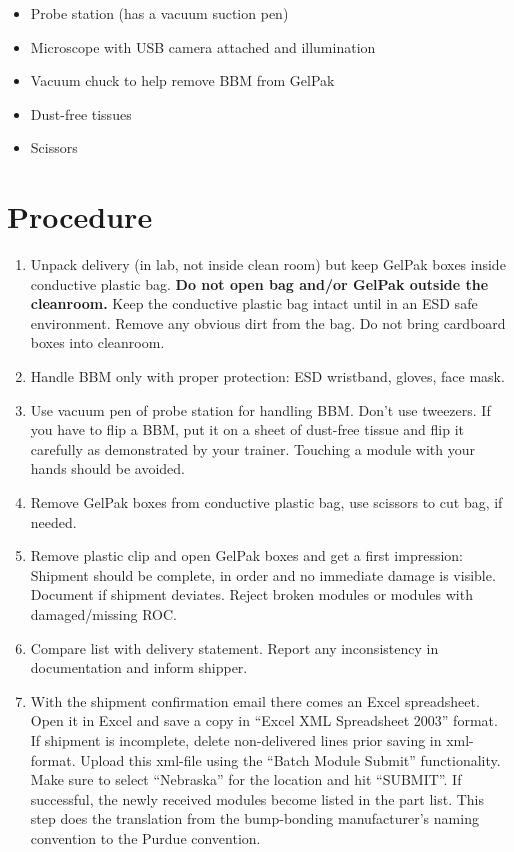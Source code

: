 \documentclass[12pt]{unlsilabsop}
\begin{document}
\begin{itemize}
    \item Probe station (has a vacuum suction pen)
    \item Microscope with USB camera attached and illumination
    \item Vacuum chuck to help remove BBM from GelPak
    \item Dust-free tissues
    \item Scissors
\end{itemize}

\section{Procedure}

\begin{enumerate}
    \item Unpack delivery (in lab, not inside clean room) but keep GelPak boxes inside conductive plastic bag. \textbf{Do not open bag and/or GelPak outside the cleanroom.} Keep the conductive plastic bag intact until in an ESD safe environment. Remove any obvious dirt from the bag. Do not bring cardboard boxes into cleanroom.
    \item Handle BBM only with proper protection: ESD wristband, gloves, face mask.
    \item Use vacuum pen of probe station for handling BBM. Don't use tweezers. If you have to flip a BBM, put it on a sheet of dust-free tissue and flip it carefully as demonstrated by your trainer. Touching a module with your hands should be avoided.
    \item Remove GelPak boxes from conductive plastic bag, use scissors to cut bag, if needed.
    \item Remove plastic clip and open GelPak boxes and get a first impression: Shipment should be complete, in order and no immediate damage is visible. Document if shipment deviates. Reject broken modules or modules with damaged/missing ROC.
    \item Compare list with delivery statement. Report any inconsistency in documentation and inform shipper.
    \item With the shipment confirmation email there comes an Excel spreadsheet. Open it in Excel and save a copy in ``Excel XML Spreadsheet 2003'' format. If shipment is incomplete, delete non-delivered lines prior saving in xml-format. Upload this xml-file using the ``Batch Module Submit'' functionality. Make sure to select ``Nebraska'' for the location and hit ``SUBMIT''. If successful, the newly received modules become listed in the part list. This step does the translation from the bump-bonding manufacturer's naming convention to the Purdue convention.


\end{enumerate}
\end{document}
